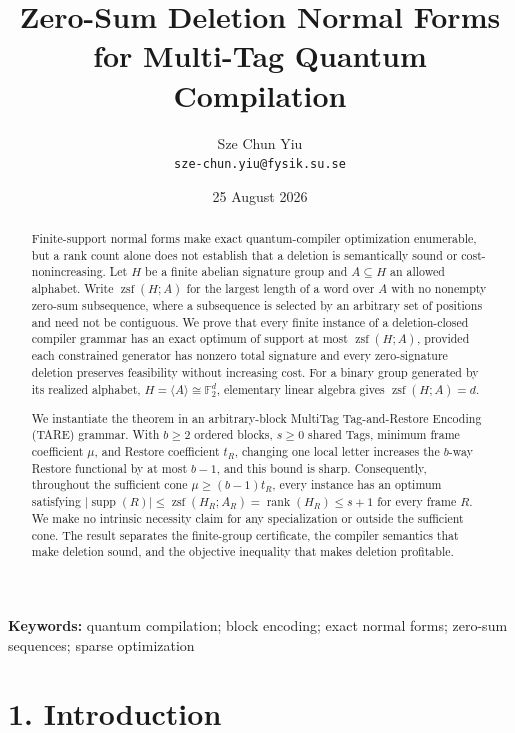 \documentclass[
  11pt,
]{article}
\title{Zero-Sum Deletion Normal Forms for Multi-Tag Quantum Compilation}
\author{Sze Chun Yiu\\\texttt{sze-chun.yiu@fysik.su.se}}
\date{25 August 2026}
\begin{document}
\maketitle

\begin{abstract}
Finite-support normal forms make exact quantum-compiler optimization
enumerable, but a rank count alone does not establish that a deletion is
semantically sound or cost-nonincreasing. Let \(H\) be a finite abelian
signature group and \(A\subseteq H\) an allowed alphabet. Write
\(\operatorname{zsf}(H; A)\) for the largest length of a word over \(A\)
with no nonempty zero-sum subsequence, where a subsequence is selected
by an arbitrary set of positions and need not be contiguous. We prove
that every finite instance of a deletion-closed compiler grammar has an
exact optimum of support at most \(\operatorname{zsf}(H; A)\), provided
each constrained generator has nonzero total signature and every
zero-signature deletion preserves feasibility without increasing cost.
For a binary group generated by its realized alphabet,
\(H=\langle A\rangle\cong\mathbb F_2^d\), elementary linear algebra
gives \(\operatorname{zsf}(H; A)=d\).

We instantiate the theorem in an arbitrary-block MultiTag
Tag-and-Restore Encoding (TARE) grammar. With \(b\ge2\) ordered blocks,
\(s\ge0\) shared Tags, minimum frame coefficient \(\mu\), and Restore
coefficient \(t_R\), changing one local letter increases the \(b\)-way
Restore functional by at most \(b-1\), and this bound is sharp.
Consequently, throughout the sufficient cone \(\mu\ge (b-1)t_R\), every
instance has an optimum satisfying
\(|\operatorname{supp}(R)|\le \operatorname{zsf}(H_R;A_R) =\operatorname{rank}(H_R)\le s+1\)
for every frame \(R\). We make no intrinsic necessity claim for any
specialization or outside the sufficient cone. The result separates the
finite-group certificate, the compiler semantics that make deletion
sound, and the objective inequality that makes deletion profitable.

\end{abstract}

\noindent\textbf{Keywords:} quantum compilation; block encoding; exact normal
forms; zero-sum sequences; sparse optimization

\hypertarget{introduction}{%
\section{1. Introduction}\label{introduction}}
\end{document}
